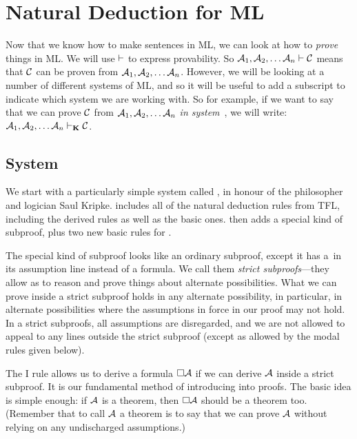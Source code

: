 \chapter{Natural Deduction for ML}
\label{Proof}

Now that we know how to make sentences in ML, we can look at how to \emph{prove} things in ML. We will use $\vdash$ to express provability.  So $\mathcal{A}_1,\mathcal{A}_2, \dots \mathcal{A}_n \vdash \mathcal{C}$ means that $\mathcal{C}$ can be proven from $\mathcal{A}_1,\mathcal{A}_2, \dots \mathcal{A}_n$. However, we will be looking at a number of different systems of ML, and so it will be useful to add a subscript to indicate which system we are working with. So for example, if we want to say that we can prove $\mathcal{C}$ from $\mathcal{A}_1,\mathcal{A}_2, \dots \mathcal{A}_n$ \emph{in system}~\mlK, we will write: $\mathcal{A}_1,\mathcal{A}_2, \dots \mathcal{A}_n \vdash_{\mathbf{K}} \mathcal{C}$.

\section{System \mlK}
\label{K}

We start with a particularly simple system called \mlK, in honour of the philosopher and logician Saul Kripke. \mlK{} includes all of the natural deduction rules from TFL, including the derived rules as well as the basic ones. \mlK{} then adds a special kind of subproof, plus two new basic rules for \ebox.

The special kind of subproof looks like an ordinary subproof, except it has a~\ebox in its assumption line instead of a formula. We call them \emph{strict subproofs}---they allow as to reason and prove things about alternate possibilities. What we can prove inside a strict subproof holds in any alternate possibility, in particular, in alternate possibilities where the assumptions in force in our proof may not hold. In a strict subproofs, all assumptions are disregarded, and we are not allowed to appeal to any lines outside the strict subproof (except as allowed by the modal rules given below).

The \ebox I rule allows us to derive a formula $\Box \mathcal{A}$ if we can derive $\mathcal{A}$ inside a strict subproof.  It is our fundamental method of introducing \ebox{} into proofs. The basic idea is simple enough: if $\mathcal{A}$ is a theorem, then $\Box \mathcal{A}$ should be a theorem too. (Remember that to call $\mathcal{A}$ a theorem is to say that we can prove $\mathcal{A}$ without relying on any undischarged assumptions.)

